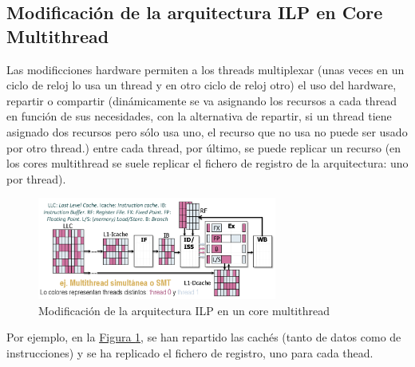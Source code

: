 \documentclass[10pt,a4paper,spanish]{report}
\begin{document}
\textcolor[rgb]{0.2,0.4,0.8}{\subsection{Modificación de la arquitectura ILP en Core Multithread}}
Las modificciones hardware permiten a los threads multiplexar (unas veces en un ciclo de reloj lo usa un thread y en otro ciclo de reloj otro) el uso del hardware, repartir o compartir (dinámicamente se va asignando los recursos a cada thread en función de sus necesidades, con la alternativa de repartir, si un thread tiene asignado dos recursos pero sólo usa uno, el recurso que no usa no puede ser usado por otro thread.) entre cada thread, por último, se puede replicar un recurso (en los cores multithread se suele replicar el fichero de registro de la arquitectura: uno por thread).

\begin{figure}[!h]
\centering
\includegraphics[width=0.7\textwidth]{61}
\caption{Modificación de la arquitectura ILP en un core multithread}
\label{mod_arq}
\end{figure}

Por ejemplo, en la \hyperref[mod_arq]{Figura \ref*{mod_arq}}, se han repartido las cachés (tanto de datos como de instrucciones) y se ha replicado el fichero de registro, uno para cada thead.
\end{document}
